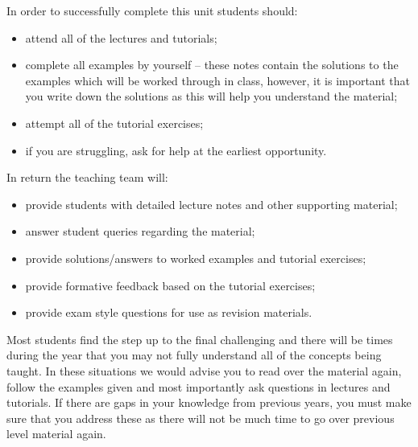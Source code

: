 \documentclass[letterpaper,10pt,english]{jupyterBook}
\begin{document}
\sphinxAtStartPar
In order to successfully complete this unit students should:
\begin{itemize}
\item {} 
\sphinxAtStartPar
attend all of the lectures and tutorials;

\item {} 
\sphinxAtStartPar
complete all examples by yourself – these notes contain the solutions to the examples which will be worked through in class, however, it is important that you write down the solutions as this will help you understand the material;

\item {} 
\sphinxAtStartPar
attempt all of the tutorial exercises;

\item {} 
\sphinxAtStartPar
if you are struggling, ask for help at the earliest opportunity.

\end{itemize}

\sphinxAtStartPar
In return the teaching team will:
\begin{itemize}
\item {} 
\sphinxAtStartPar
provide students with detailed lecture notes and other supporting material;

\item {} 
\sphinxAtStartPar
answer student queries regarding the material;

\item {} 
\sphinxAtStartPar
provide solutions/answers to worked examples and tutorial exercises;

\item {} 
\sphinxAtStartPar
provide formative feedback based on the tutorial exercises;

\item {} 
\sphinxAtStartPar
provide exam style questions for use as revision materials.

\end{itemize}

\sphinxAtStartPar
Most students find the step up to the final challenging and there will be times during the year that you may not fully understand all of the concepts being taught. In these situations we would advise you to read over the material again, follow the examples given and most importantly ask questions in lectures and tutorials. If there are gaps in your knowledge from previous years, you must make sure that you address these as there will not be much time to go over previous level material again.
\end{document}

